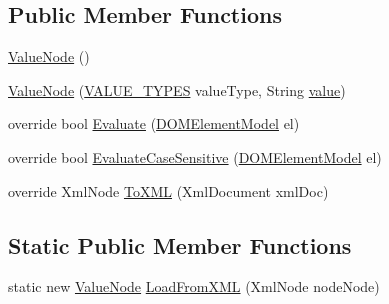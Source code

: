 \subsection*{Public Member Functions}
\begin{DoxyCompactItemize}
\item 
\hyperlink{class_web_analyzer_1_1_models_1_1_settings_model_1_1_expression_tree_1_1_value_node_afafaa57c7b7f5cdc5447139118bd6d47}{Value\+Node} ()
\item 
\hyperlink{class_web_analyzer_1_1_models_1_1_settings_model_1_1_expression_tree_1_1_value_node_a62cfbb11d38c3f17e240cb2c5a1ac6f1}{Value\+Node} (\hyperlink{class_web_analyzer_1_1_models_1_1_settings_model_1_1_expression_tree_1_1_value_node_ac18254d82bd6e0d754ed1a2484882d11}{V\+A\+L\+U\+E\+\_\+\+T\+Y\+P\+E\+S} value\+Type, String \hyperlink{_u_i_2_h_t_m_l_resources_2js_2lib_2underscore_8min_8js_af7e1471ab89699458c4df8bb657298f6}{value})
\item 
override bool \hyperlink{class_web_analyzer_1_1_models_1_1_settings_model_1_1_expression_tree_1_1_value_node_a4372873a2359e8ef131624bad5bbaa58}{Evaluate} (\hyperlink{class_web_analyzer_1_1_models_1_1_data_model_1_1_d_o_m_element_model}{D\+O\+M\+Element\+Model} el)
\item 
override bool \hyperlink{class_web_analyzer_1_1_models_1_1_settings_model_1_1_expression_tree_1_1_value_node_a79986418c7a3439d1cb5d8f14ded199e}{Evaluate\+Case\+Sensitive} (\hyperlink{class_web_analyzer_1_1_models_1_1_data_model_1_1_d_o_m_element_model}{D\+O\+M\+Element\+Model} el)
\item 
override Xml\+Node \hyperlink{class_web_analyzer_1_1_models_1_1_settings_model_1_1_expression_tree_1_1_value_node_a801c7d0fdc559f12d8c8e6ae1943b59d}{To\+X\+M\+L} (Xml\+Document xml\+Doc)
\end{DoxyCompactItemize}
\subsection*{Static Public Member Functions}
\begin{DoxyCompactItemize}
\item 
static new \hyperlink{class_web_analyzer_1_1_models_1_1_settings_model_1_1_expression_tree_1_1_value_node}{Value\+Node} \hyperlink{class_web_analyzer_1_1_models_1_1_settings_model_1_1_expression_tree_1_1_value_node_adb68b0f5d8d1c99e3abca965f48a67d0}{Load\+From\+X\+M\+L} (Xml\+Node node\+Node)
\end{DoxyCompactItemize}

